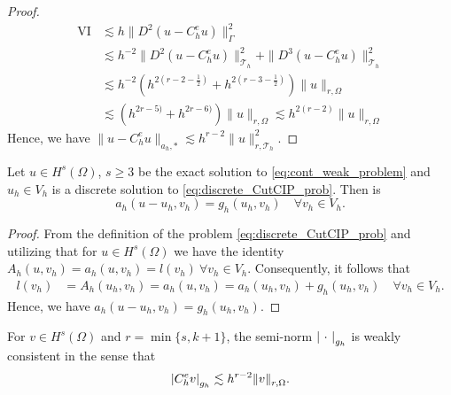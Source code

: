 \begin{proof}
        \begin{equation}
            \begin{split}
            \mathrm{VI} &    \lesssim h \|  D^2  ( u - C_{h}^{e}u ) \|_{\Gamma }^{2  }  \\
            & \lesssim  h^{-2} \| D^2 ( u - C_{h}^{e}u )  \|_{ \mathcal{T}_{h}   }^{2  } + \| D^3( u - C_{h}^{e}u ) \|_{ \mathcal{T}_{h}   }^{ 2 } \\
            &  \lesssim h^{-2}( h^{2(r - 2 - \frac{1}{2})} + h^{2(r - 3 - \frac{1}{2})})\| u \|_{r,\Omega   }^{  } \\
            &  \lesssim ( h^{2r - 5)} + h^{2r - 6)})\| u \|_{r,\Omega   }^{  } \lesssim h^{2(r-2)} \| u \|_{r,\Omega   }^{  }
            \end{split}
        \end{equation}
    Hence, we have $ \| u - C_{h}^{e} u \|_{a_{h},*  }^{  } \lesssim   h^{r-2}  \| u \|_{ r, \mathcal{T}_{h}   }^{2  } $.
\end{proof}

\begin{lemma}
Let $u \in H^{s}( \Omega )  $, $ s\ge 3 $  be the exact solution to   \eqref{eq:cont_weak_problem} and $u_{h} \in V_{h}$ is a discrete solution to \eqref{eq:discrete_CutCIP_prob}. Then is \[
    a_{h}( u - u_{h}, v_{h}) = g_{h} ( u_{h}, v_{h}) \quad \forall v_{h} \in V_{h}.
    \]
\end{lemma}

\begin{proof}
   From the definition of the problem \eqref{eq:discrete_CutCIP_prob} and utilizing that for $u \in H^{s}( \Omega ) $ we have the identity  $A_{h}( u,v_{h}) = a_{h}( u,v_{h}) = l(v_{h} )  \ \forall v_{h} \in V_{h} $. Consequently, it follows that \[
       \begin{split}
   l(v_{h} ) & =  A_{h}( u_{h},v_{h}) =  a_{h}( u,v_{h})  = a_{h}( u_{h},v_{h})+g_{h}( u_{h},v_{h})  \quad \forall  v_{h} \in  V_{h}.
       \end{split}
   \]
    Hence, we have $a_{h}( u -  u_{h}, v_{h}) = g_{h}( u_{h},v_{h})  $.
\end{proof}

\begin{assumption*}[EP2]
    For $v \in H^{s}( \Omega ) $ and $r = \min \{s,k+1 \} $, the semi-norm $\left\lvert  \ \cdot \   \right\rvert_{g_{h}} $ is weakly consistent in the sense that
    \begin{equation}
        \label{as:bi_EP2}
        \left\lvert  C _{h}^{e} v  \right\rvert _{g_{h}} \lesssim  h^{r-2} \| v \|_{ r,\Omega  }^{  }.
    \end{equation}
\end{assumption*}

